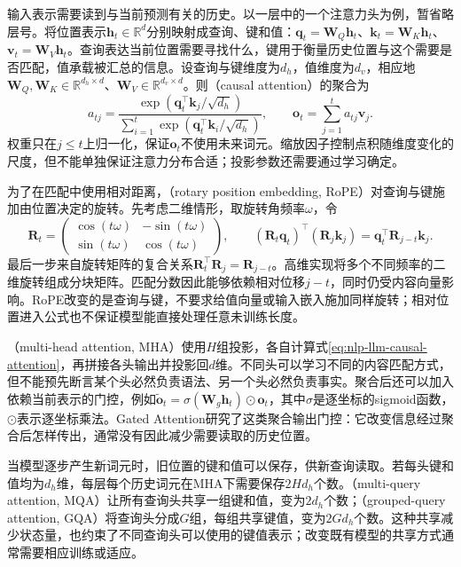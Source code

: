 输入表示需要读到与当前预测有关的历史。以一层中的一个注意力头为例，暂省略层号。将位置表示$\bm h_t\in\mathbb R^d$分别映射成查询、键和值：$\bm q_t=\bm W_Q\bm h_t$、$\bm k_t=\bm W_K\bm h_t$、$\bm v_t=\bm W_V\bm h_t$。查询表达当前位置需要寻找什么，键用于衡量历史位置与这个需要是否匹配，值承载被汇总的信息。设查询与键维度为$d_h$，值维度为$d_v$，相应地$\bm W_Q,\bm W_K\in\mathbb R^{d_h\times d}$、$\bm W_V\in\mathbb R^{d_v\times d}$。则（causal attention）的聚合为
\begin{equation}
 a_{tj}=\frac{\exp(\bm q_t^{\top}\bm k_j/\sqrt{d_h})}
 {\sum_{i=1}^{t}\exp(\bm q_t^{\top}\bm k_i/\sqrt{d_h})},
 \qquad
 \bm o_t=\sum_{j=1}^{t}a_{tj}\bm v_j.
 \label{eq:nlp-llm-causal-attention}
\end{equation}
权重只在$j\leq t$上归一化，保证$\bm o_t$不使用未来词元。缩放因子控制点积随维度变化的尺度，但不能单独保证注意力分布合适；投影参数还需要通过学习确定。

为了在匹配中使用相对距离，（rotary position embedding, RoPE）对查询与键施加由位置决定的旋转。先考虑二维情形，取旋转角频率$\omega$，令
\begin{equation}
 \bm R_t=\begin{pmatrix}
 \cos(t\omega)&-\sin(t\omega)\\
 \sin(t\omega)&\cos(t\omega)
 \end{pmatrix},\qquad
 (\bm R_t\bm q_t)^{\top}(\bm R_j\bm k_j)
 =\bm q_t^{\top}\bm R_{j-t}\bm k_j.
 \label{eq:nlp-llm-rope}
\end{equation}
最后一步来自旋转矩阵的复合关系$\bm R_t^{\top}\bm R_j=\bm R_{j-t}$。高维实现将多个不同频率的二维旋转组成分块矩阵。匹配分数因此能够依赖相对位移$j-t$，同时仍受内容向量影响。RoPE改变的是查询与键，不要求给值向量或输入嵌入施加同样旋转；相对位置进入公式也不保证模型能直接处理任意未训练长度。

（multi-head attention, MHA）使用$H$组投影，各自计算式\eqref{eq:nlp-llm-causal-attention}，再拼接各头输出并投影回$d$维。不同头可以学习不同的内容匹配方式，但不能预先断言某个头必然负责语法、另一个头必然负责事实。聚合后还可以加入依赖当前表示的门控，例如$\tilde{\bm o}_t=\sigma(\bm W_g\bm h_t)\odot\bm o_t$，其中$\sigma$是逐坐标的sigmoid函数，$\odot$表示逐坐标乘法。Gated Attention研究了这类聚合输出门控：它改变信息经过聚合后怎样传出，通常没有因此减少需要读取的历史位置。

当模型逐步产生新词元时，旧位置的键和值可以保存，供新查询读取。若每头键和值均为$d_h$维，每层每个历史词元在MHA下需要保存$2Hd_h$个数。（multi-query attention, MQA）让所有查询头共享一组键和值，变为$2d_h$个数；（grouped-query attention, GQA）将查询头分成$G$组，每组共享键值，变为$2Gd_h$个数。这种共享减少状态量，也约束了不同查询头可以使用的键值表示；改变既有模型的共享方式通常需要相应训练或适应。


